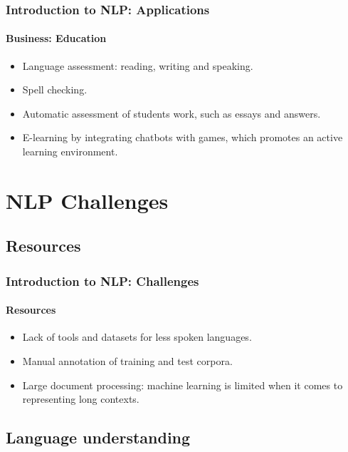 \documentclass[xcolor=table]{beamer}
\begin{document}
\begin{frame}
\frametitle{Introduction to NLP: Applications}
\framesubtitle{Business: Education}

\begin{itemize}
	\item Language assessment: reading, writing and speaking.
	\item Spell checking.
	\item Automatic assessment of students work, such as essays and answers.
	\item E-learning by integrating chatbots with games, which promotes an active learning environment.
\end{itemize}

\end{frame}

\section{NLP Challenges}

%

\subsection{Resources}

\begin{frame}
\frametitle{Introduction to NLP: Challenges}
\framesubtitle{Resources}

\begin{itemize}
	\item Lack of tools and datasets for less spoken languages.
	\item Manual annotation of training and test corpora.
	\item Large document processing: machine learning is limited when it comes to representing long contexts.
\end{itemize}
\end{frame}

\subsection{Language understanding}
\end{document}
